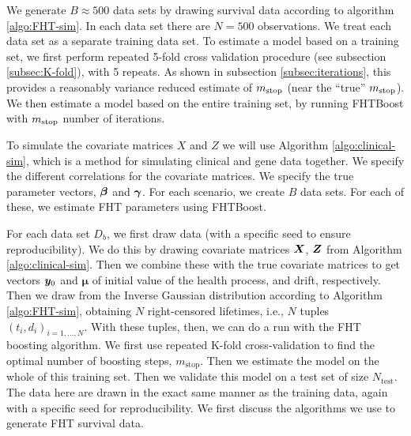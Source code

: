 We generate $B\approx500$ data sets by drawing survival data according to algorithm \ref{algo:FHT-sim}.
In each data set there are $N=500$ observations. 
We treat each data set as a separate training data set.
To estimate a model based on a training set, we first perform repeated 5-fold cross validation procedure (see subsection \ref{subsec:K-fold}), with 5 repeats.
As shown in subsection \ref{subsec:iterations}, this provides a reasonably variance reduced estimate of $m_{\text{stop}}$ (near the ``true'' $m_{\text{stop}}$).
We then estimate a model based on the entire training set, by running FHTBoost with $m_{\text{stop}}$ number of iterations.

To simulate the covariate matrices $X$ and $Z$ we will use Algorithm \ref{algo:clinical-sim}, which is a method for simulating clinical and gene data together.
We specify the different correlations for the covariate matrices.
We specify the true parameter vectors, $\boldsymbol{\beta}$ and $\boldsymbol{\gamma}$.
For each scenario, we create $B$ data sets.
For each of these, we estimate FHT parameters using FHTBoost.

For each data set $D_b$, we first draw data (with a specific seed to ensure reproducibility).
We do this by drawing covariate matrices $\bm{X}$, $\bm{Z}$ from Algorithm \ref{algo:clinical-sim}.
Then we combine these with the true covariate matrices to get vectors $\bm{y}_0$ and $\mathbf{\mu}$ of initial value of the health process, and drift, respectively.
Then we draw from the Inverse Gaussian distribution according to Algorithm \ref{algo:FHT-sim}, obtaining $N$ right-censored lifetimes, i.e., $N$ tuples $(t_i,d_i)_{i=1,\ldots,N}$.
With these tuples, then, we can do a run with the FHT boosting algorithm. We first use repeated K-fold cross-validation to find the optimal number of boosting steps, $m_{\text{stop}}$.
Then we estimate the model on the whole of this training set.
Then we validate this model on a test set of size $N_{\text{test}}$.
The data here are drawn in the exact same manner as the training data, again with a specific seed for reproducibility.
We first discuss the algorithms we use to generate FHT survival data.


